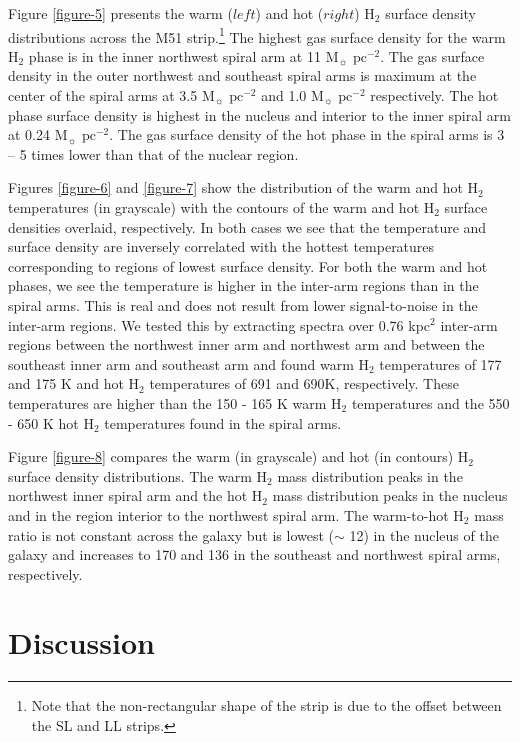 \documentclass[12pt,preprint]{aastex}
\begin{document}
Figure \ref{figure-5} presents the warm ($left$) and hot ($right$)
H$_2$ surface density distributions across the M51 
strip.\footnote{Note that the non-rectangular shape of the strip 
is due to the offset between the SL and LL strips.}  The highest 
gas surface density for the warm H$_2$ phase is in 
the inner northwest spiral arm at 11 $\mathrm{M_\sun}$ 
$\mathrm{pc^{-2}}$. The gas surface density in the outer 
northwest and southeast spiral arms is maximum at the 
center of the spiral arms at 3.5 $\mathrm{M_\sun}$ 
$\mathrm{pc^{-2}}$ and 1.0 $\mathrm{M_\sun}$ $\mathrm{pc^{-2}}$ 
respectively.  The hot phase surface density is highest in 
the nucleus and interior to the inner spiral arm at 0.24 
$\mathrm{M_\sun}$ $\mathrm{pc^{-2}}$.  The gas surface 
density of the hot phase in the spiral arms is 3 -- 5 times 
lower than that of the nuclear region.

Figures \ref{figure-6} and \ref{figure-7} show the distribution 
of the warm and hot H$_2$ temperatures (in grayscale) with 
the contours of the warm and hot H$_2$ surface densities overlaid, respectively.  In 
both cases we see that the temperature and surface density 
are inversely correlated with the hottest temperatures 
corresponding to regions of lowest surface density.  For 
both the warm and hot phases, we see the temperature 
is higher in the inter-arm regions than in the spiral arms. 
This is real and does not result from lower signal-to-noise 
in the inter-arm regions.   We tested this by extracting spectra 
over 0.76 kpc$^2$ inter-arm regions between the northwest inner arm and northwest 
arm and between the southeast inner arm and southeast arm and found warm H$_2$ 
temperatures of 177 and 175 K and hot H$_2$ temperatures 
of 691 and 690K, respectively.  These temperatures are higher 
than the 150 - 165 K warm H$_2$ temperatures and the 550 - 650 
K hot H$_2$ temperatures found in the spiral arms.

Figure \ref{figure-8} compares the warm (in grayscale) 
and hot (in contours) H$_2$ surface density distributions.   
The warm H$_2$ mass distribution peaks
in the northwest inner spiral arm and the hot H$_2$ 
mass distribution peaks in the nucleus and in the 
region interior to the northwest spiral arm.  The warm-to-hot 
H$_2$ mass ratio is not constant across 
the galaxy but is lowest ($\sim$ 12) in the nucleus of the 
galaxy and increases to 170 and 136 in the southeast 
and northwest spiral arms, respectively.

\section{Discussion}
\end{document}
